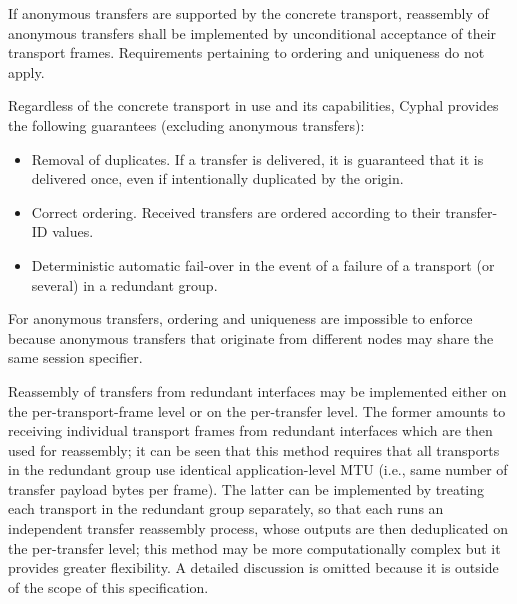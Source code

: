 If anonymous transfers are supported by the concrete transport,
reassembly of anonymous transfers shall be implemented by unconditional acceptance of their transport frames.
Requirements pertaining to ordering and uniqueness do not apply.

\begin{remark}
    Regardless of the concrete transport in use and its capabilities,
    Cyphal provides the following guarantees (excluding anonymous transfers):

    \begin{itemize}
        \item Removal of duplicates. If a transfer is delivered, it is guaranteed that it is delivered once,
              even if intentionally duplicated by the origin.
        \item Correct ordering. Received transfers are ordered according to their transfer-ID values.
        \item Deterministic automatic fail-over in the event of a failure of a transport (or several)
              in a redundant group.
    \end{itemize}

    For anonymous transfers, ordering and uniqueness are impossible to enforce
    because anonymous transfers that originate from different nodes may share the same session specifier.

    Reassembly of transfers from redundant interfaces may be implemented either on the per-transport-frame level
    or on the per-transfer level.
    The former amounts to receiving individual transport frames from redundant interfaces
    which are then used for reassembly; it can be seen that this method requires that all transports in the
    redundant group use identical application-level MTU (i.e., same number of transfer payload bytes per frame).
    The latter can be implemented by treating each transport in the redundant group separately,
    so that each runs an independent transfer reassembly process, whose outputs are then deduplicated
    on the per-transfer level; this method may be more computationally complex but it provides greater flexibility.
    A detailed discussion is omitted because it is outside of the scope of this specification.
\end{remark}
